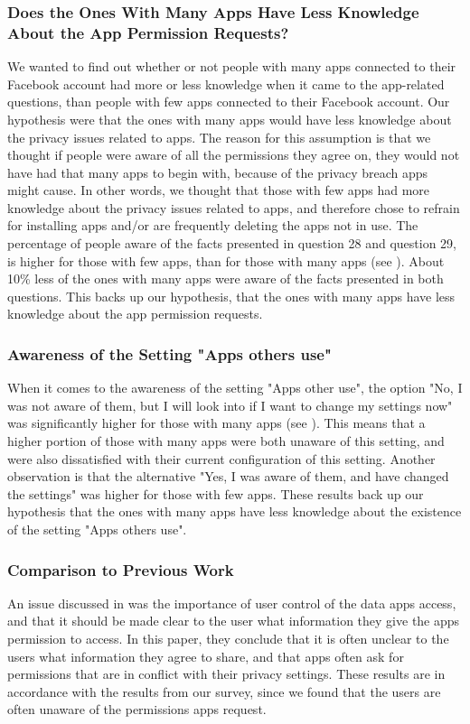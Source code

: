 \subsubsection{Does the Ones With Many Apps Have Less Knowledge About the App Permission Requests?}
We wanted to find out whether or not people with many apps connected to their Facebook account had more or less knowledge when it came to the app-related questions, than people with few apps connected to their Facebook account. Our hypothesis were that the ones with many apps would have less knowledge about the privacy issues related to apps. The reason for this assumption is that we thought if people were aware of all the permissions they agree on, they would not have had that many apps to begin with, because of the privacy breach apps might cause. In other words, we thought that those with few apps had more knowledge about the privacy issues related to apps, and therefore chose to refrain for installing apps and/or are frequently deleting the apps not in use. The percentage of people aware of the facts presented in question 28 and question 29, is higher for those with few apps, than for those with many apps (see ). About 10\% less of the ones with many apps were aware of the facts presented in both questions. This backs up our hypothesis, that the ones with many apps have less knowledge about the app permission requests. 

\subsubsection{Awareness of the Setting "Apps others use"}
When it comes to the awareness of the setting "Apps other use", the option "No, I was not aware of them, but I will look into if I want to change my settings now" was significantly higher for those with many apps (see ). This means that a higher portion of those with many apps were both unaware of this setting, and were also dissatisfied with their current configuration of this setting. Another observation is that the alternative "Yes, I was aware of them, and have changed the settings" was higher for those with few apps. These results back up our hypothesis that the ones with many apps have less knowledge about the existence of the setting "Apps others use". 

\subsubsection{Comparison to Previous Work}
An issue discussed in \cite{thirdPartyApps} was the importance of user control of the data apps access, and that it should be made clear to the user what information they give the apps permission to access. In this paper, they conclude that it is often unclear to the users what information they agree to share, and that apps often ask for permissions that are in conflict with their privacy settings. These results are in accordance with the results from our survey, since we found that the users are often unaware of the permissions apps request. 


